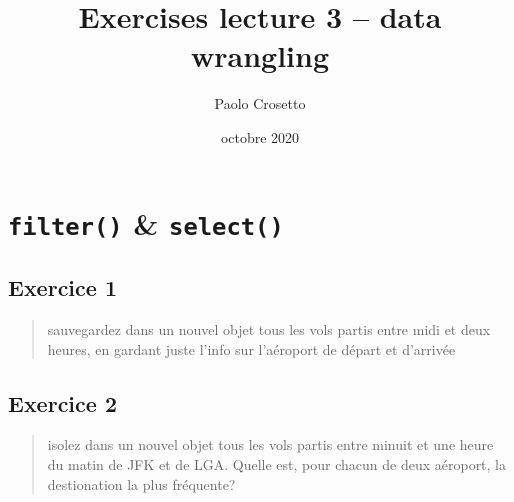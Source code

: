 \documentclass[
]{article}
\title{Exercises lecture 3 -- data wrangling}
\author{Paolo Crosetto}
\date{octobre 2020}
\newenvironment{Shaded}{\begin{snugshade}}{\end{snugshade}}
\newcommand{\DecValTok}[1]{\textcolor[rgb]{0.00,0.00,0.81}{#1}}
\newcommand{\KeywordTok}[1]{\textcolor[rgb]{0.13,0.29,0.53}{\textbf{#1}}}
\newcommand{\NormalTok}[1]{#1}
\newcommand{\OperatorTok}[1]{\textcolor[rgb]{0.81,0.36,0.00}{\textbf{#1}}}
\newcommand{\StringTok}[1]{\textcolor[rgb]{0.31,0.60,0.02}{#1}}
\begin{document}
\maketitle

\hypertarget{filter-select}{%
\section{\texorpdfstring{\texttt{filter()} \&
\texttt{select()}}{filter() \& select()}}\label{filter-select}}

\hypertarget{exercice-1}{%
\subsection{Exercice 1}\label{exercice-1}}

\begin{quote}
sauvegardez dans un nouvel objet tous les vols partis entre midi et deux
heures, en gardant juste l'info sur l'aéroport de départ et d'arrivée
\end{quote}

\begin{Shaded}
\end{Shaded}

\hypertarget{exercice-2}{%
\subsection{Exercice 2}\label{exercice-2}}

\begin{quote}
isolez dans un nouvel objet tous les vols partis entre minuit et une
heure du matin de JFK et de LGA. Quelle est, pour chacun de deux
aéroport, la destionation la plus fréquente?
\end{quote}

\begin{Shaded}
\end{Shaded}
\end{document}
